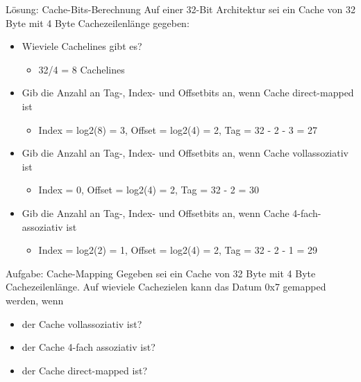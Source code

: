 \documentclass[
  german,            %
  aspectratio=169,    %
]{tumbeamer}
\begin{document}
\begin{frame}[c]{Lösung: Cache-Bits-Berechnung}{}
	Auf einer 32-Bit Architektur sei ein Cache von 32 Byte mit 4 Byte Cachezeilenlänge gegeben:
	\vspace{0.5cm}
	\begin{itemize}
		\item Wieviele Cachelines gibt es?
		\begin{itemize}
			\item 32/4 = 8 Cachelines
		\end{itemize}
		\item Gib die Anzahl an Tag-, Index- und Offsetbits an, wenn Cache direct-mapped ist
		\begin{itemize}
			\item Index = log2(8) = 3, Offset = log2(4) = 2, Tag = 32 - 2 - 3 = 27
		\end{itemize}
		\item Gib die Anzahl an Tag-, Index- und Offsetbits an, wenn Cache vollassoziativ ist
		\begin{itemize}
			\item Index = 0, Offset = log2(4) = 2, Tag = 32 - 2 = 30
		\end{itemize}
		\item Gib die Anzahl an Tag-, Index- und Offsetbits an, wenn Cache 4-fach-assoziativ ist
		\begin{itemize}
			\item Index = log2(2) = 1, Offset = log2(4) = 2, Tag = 32 - 2 - 1 = 29
		\end{itemize}
	\end{itemize}
\end{frame}

\begin{frame}[c]{Aufgabe: Cache-Mapping}{}
	Gegeben sei ein Cache von 32 Byte mit 4 Byte Cachezeilenlänge. Auf wieviele Cachezielen kann das Datum 0x7 gemapped werden, wenn
	\vspace{0.5cm}
	\begin{itemize}
		\item der Cache vollassoziativ ist?
		\item der Cache 4-fach assoziativ ist?
		\item der Cache direct-mapped ist?
	\end{itemize}
\end{frame}
\end{document}
